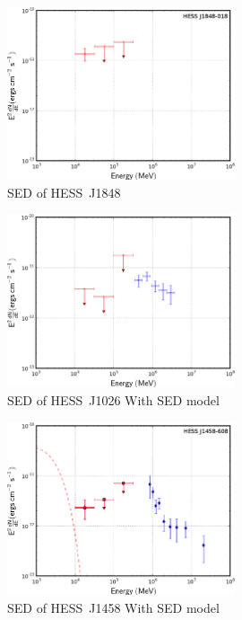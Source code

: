 \begin{figure}[h!]
\centering
\includegraphics[width=0.60\textwidth]{figures/HESSJ1848.eps}
\caption{SED of HESS~J1848
\label{fig:1848}}
\end{figure}

\begin{figure}[h!]
\centering
\includegraphics[width=0.60\textwidth]{figures/HESSJ1026.eps}
\caption{SED of HESS~J1026 With SED model
\label{fig:1026}}
\end{figure}

\begin{figure}[h!]
\centering
\includegraphics[width=0.60\textwidth]{figures/HESSJ1458.eps}
\caption{SED of HESS~J1458 With SED model
\label{fig:1458}}
\end{figure}

